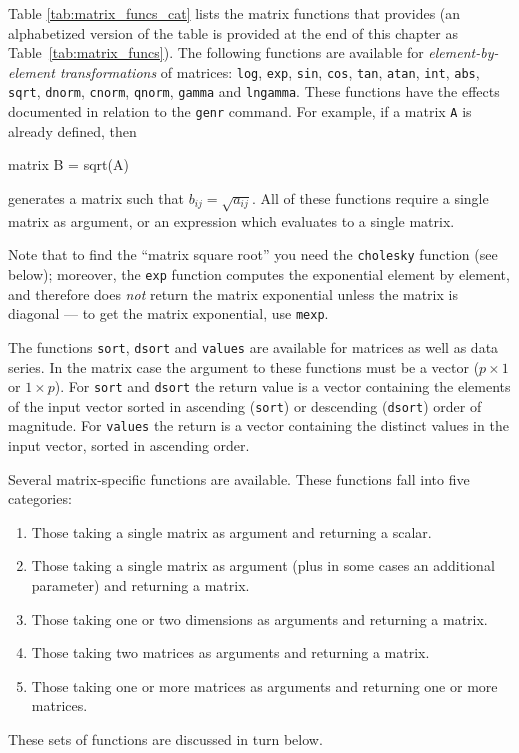 Table \ref{tab:matrix_funcs_cat} lists the matrix functions that
 provides (an alphabetized version of the table is
provided at the end of this chapter as Table~\ref{tab:matrix_funcs}).
The following functions are available for \textit{element-by-element
  transformations} of matrices: \texttt{log}, \texttt{exp},
\texttt{sin}, \texttt{cos}, \texttt{tan}, \texttt{atan}, \texttt{int},
\texttt{abs}, \texttt{sqrt}, \texttt{dnorm}, \texttt{cnorm},
\texttt{qnorm}, \texttt{gamma} and \texttt{lngamma}.  These functions
have the effects documented in relation to the \texttt{genr} command.
For example, if a matrix \texttt{A} is already defined, then
%
\begin{code}
matrix B = sqrt(A)
\end{code}
%
generates a matrix such that $b_{ij} = \sqrt{a_{ij}}$.  All of these
functions require a single matrix as argument, or an expression which
evaluates to a single matrix.

Note that to find the ``matrix square root'' you need the
\texttt{cholesky} function (see below); moreover, the \texttt{exp}
function computes the exponential element by element, and therefore
does \emph{not} return the matrix exponential unless the matrix is
diagonal --- to get the matrix exponential, use \texttt{mexp}.
  
The functions \texttt{sort}, \texttt{dsort} and \texttt{values}
are available for matrices as well as data series.  In the matrix case
the argument to these functions must be a vector ($p \times 1$ or
$1\times p$).  For \texttt{sort} and \texttt{dsort} the return value
is a vector containing the elements of the input vector sorted in
ascending (\texttt{sort}) or descending (\texttt{dsort}) order of
magnitude.  For \texttt{values} the return is a vector containing the
distinct values in the input vector, sorted in ascending order.

Several matrix-specific functions are available.  These functions fall
into five categories:
%
\begin{enumerate}
\item Those taking a single matrix as argument and returning a scalar.
\item Those taking a single matrix as argument (plus in some cases an
  additional parameter) and returning a matrix.
\item Those taking one or two dimensions as arguments and
  returning a matrix.
\item Those taking two matrices as arguments and returning a matrix.
\item Those taking one or more matrices as arguments and returning one
  or more matrices.
\end{enumerate}
%
These sets of functions are discussed in turn below.

